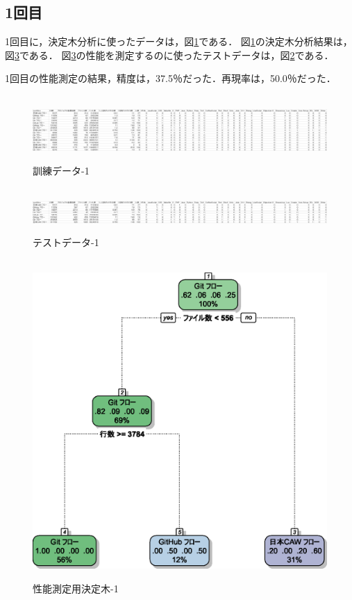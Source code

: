 \subsection{1回目}
1回目に，決定木分析に使ったデータは，図\ref{データ1-1}である．
図\ref{データ1-1}の決定木分析結果は，図\ref{決定木1}である．
図\ref{決定木1}の性能を測定するのに使ったテストデータは，図\ref{データ1-2}である．

1回目の性能測定の結果，精度は，37.5％だった．再現率は，50.0％だった．
\begin{figure}[H]
\centering　
\includegraphics[width=13cm]{1-1.png}
\caption{訓練データ-1}\label{データ1-1}
\end{figure}
\begin{figure}[H]
\centering　
\includegraphics[width=13cm]{1-2.png}
\caption{テストデータ-1}\label{データ1-2}
\end{figure}
\begin{figure}[H]
\centering　
\includegraphics[width=13cm]{1.eps}
\caption{性能測定用決定木-1}\label{決定木1}
\end{figure}

